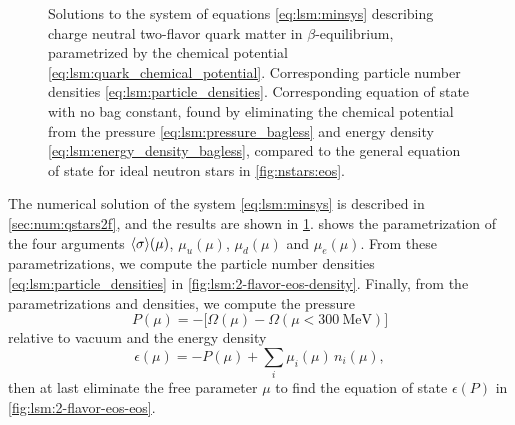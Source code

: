 \begin{figure}
\caption{\label{fig:lsm:2-flavor-eos}%
 Solutions to the system of equations \eqref{eq:lsm:minsys} describing charge neutral two-flavor quark matter in $\beta$-equilibrium, parametrized by the chemical potential \eqref{eq:lsm:quark_chemical_potential}.
 Corresponding particle number densities \eqref{eq:lsm:particle_densities}.
 Corresponding equation of state with no bag constant, found by eliminating the chemical potential from the pressure \eqref{eq:lsm:pressure_bagless} and energy density \eqref{eq:lsm:energy_density_bagless}, compared to the general equation of state for ideal neutron stars in \cref{fig:nstars:eos}.
}
\end{figure}

The numerical solution of the system \eqref{eq:lsm:minsys} is described in \cref{sec:num:qstars2f}, and the results are shown in \cref{fig:lsm:2-flavor-eos}.
 shows the parametrization of the four arguments $\langle \sigma \rangle(\mu)$, $\mu_u(\mu)$, $\mu_d(\mu)$ and $\mu_e(\mu)$.
From these parametrizations, we compute the particle number densities \eqref{eq:lsm:particle_densities} in \cref{fig:lsm:2-flavor-eos-density}.
Finally, from the parametrizations and densities, we compute the pressure
\begin{equation}
	P(\mu) = -\Big[\Omega(\mu) - \Omega(\mu<\SI{300}{\mega\electronvolt})\Big]
\label{eq:lsm:pressure_bagless}
\end{equation}
relative to vacuum and the energy density
\begin{equation}
	\epsilon(\mu) = -P(\mu) + \sum_i \mu_i(\mu) \, n_i(\mu) ,
\label{eq:lsm:energy_density_bagless}
\end{equation}
then at last eliminate the free parameter $\mu$ to find the equation of state $\epsilon(P)$ in \cref{fig:lsm:2-flavor-eos-eos}.

